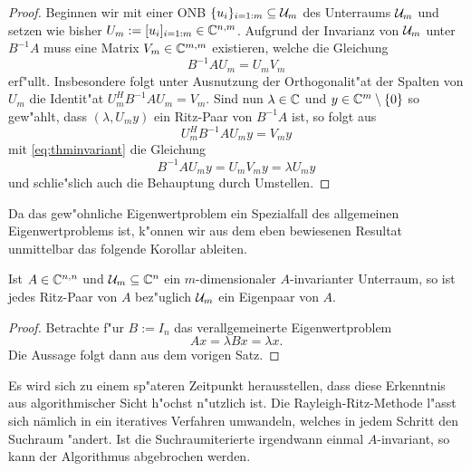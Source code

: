 \begin{proof}
Beginnen wir mit einer ONB $\{u_i\}_{i=1:m}\subseteq\mathcal{U}_m$ des Unterraums $\mathcal{U}_m$
und setzen wie bisher $U_m := [u_i]_{i=1:m}\in\mathbb{C}^{n,m}$. Aufgrund der Invarianz
von $\mathcal{U}_m$ unter $B^{-1}A$ muss eine Matrix $V_m \in \mathbb{C}^{m,m}$ existieren, welche
die Gleichung
\begin{equation}\label{eq:thminvariant}
B^{-1}A U_m = U_m V_m
\end{equation}
erf"ullt. Insbesondere folgt unter Ausnutzung der Orthogonalit"at der Spalten
von $U_m$ die Identit"at $U_m^H B^{-1}A U_m = V_m$.
Sind nun $\lambda\in\mathbb{C}$ und $y\in\mathbb{C}^m\setminus\{0\}$ so gew"ahlt, dass $(\lambda, U_m y)$
ein Ritz-Paar von $B^{-1}A$ ist, so folgt aus
\[
U_m^H B^{-1}A U_m y = V_m y
\]
mit \eqref{eq:thminvariant} die Gleichung
\[
B^{-1}AU_m y = U_m V_m y = \lambda U_m y
\]
und schlie"slich auch die Behauptung durch Umstellen.
\end{proof}

Da das gew"ohnliche Eigenwertproblem ein Spezialfall des allgemeinen Eigenwertproblems
ist, k"onnen wir aus dem eben bewiesenen Resultat unmittelbar das folgende Korollar
ableiten.

\begin{kor}
Ist $A\in\mathbb{C}^{n,n}$ und $\mathcal{U}_m\subseteq \mathbb{C}^n$ ein $m$-dimensionaler $A$-invarianter Unterraum, so ist
jedes Ritz-Paar von $A$ bez"uglich $\mathcal{U}_m$ ein Eigenpaar von $A$.
\end{kor}

\begin{proof}
Betrachte f"ur $B:=I_n$ das verallgemeinerte Eigenwertproblem
\[
Ax = \lambda Bx = \lambda x.
\]
Die Aussage folgt dann aus dem vorigen Satz.
\end{proof}

Es wird sich zu einem sp"ateren Zeitpunkt herausstellen, dass diese Erkenntnis aus algorithmischer Sicht h"ochst n"utzlich ist.
Die Rayleigh-Ritz-Methode l"asst sich nämlich in ein iteratives Verfahren umwandeln, welches in jedem Schritt den Suchraum "andert. Ist die Suchraumiterierte irgendwann einmal $A$-invariant, so kann der Algorithmus abgebrochen werden.\\

